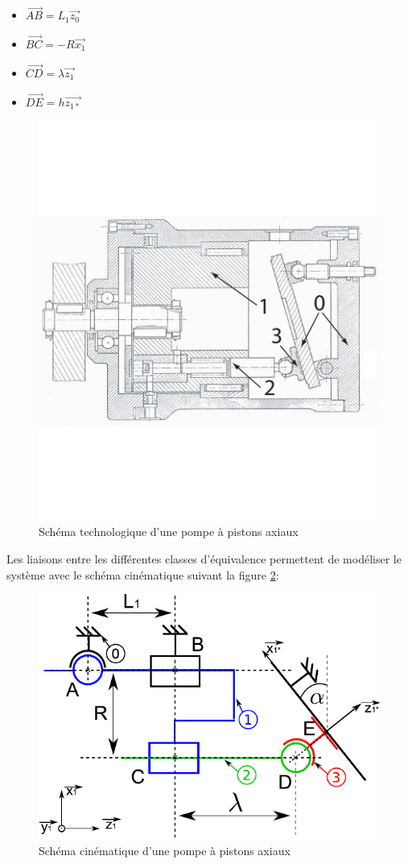 \documentclass[10pt,fleqn]{article} %
\begin{document}
\begin{multicols}{2}
\begin{multicols}{2}
\begin{itemize}
\item $\overrightarrow{AB}=L_1\overrightarrow{z_0}$
\item $\overrightarrow{BC}=-R\overrightarrow{x_1}$
\item $\overrightarrow{CD}=\lambda\overrightarrow{z_1}$
\item $\overrightarrow{DE}=h\overrightarrow{z_{1*}}$
\end{itemize}

\begin{figure}[ht!]
			\begin{center}
				\includegraphics[width=.7\textwidth]{images/pompe.pdf}
			\end{center}
			\caption{Schéma technologique d'une pompe à pistons axiaux \label{fig:techno_pompe}}
\end{figure}


Les liaisons entre les différentes classes d'équivalence permettent de modéliser le système avec le schéma cinématique suivant la figure \ref{fig:cine_pompe}: 

\begin{figure}[ht!]
			\begin{center}
				\includegraphics[width=.7\textwidth]{images/pompe_cine.pdf}
			\end{center}
			\caption{Schéma cinématique d'une pompe à pistons axiaux \label{fig:cine_pompe}}
\end{figure}


\end{multicols}
\end{multicols}
\end{document}
